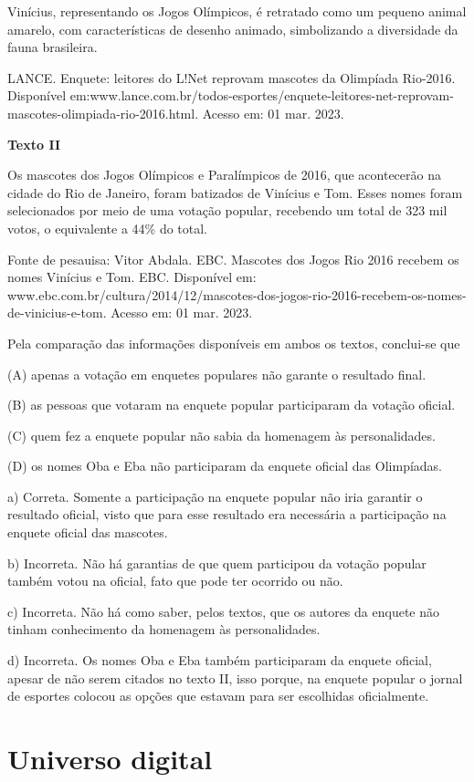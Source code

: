 \begin{itemize}
\begin{itemize}
Vinícius, representando os Jogos Olímpicos, é retratado como um pequeno
animal amarelo, com características de desenho animado, simbolizando a
diversidade da fauna brasileira.

LANCE. Enquete: leitores do L!Net reprovam mascotes da Olimpíada
Rio-2016. Disponível
em:www.lance.com.br/todos-esportes/enquete-leitores-net-reprovam-mascotes-olimpiada-rio-2016.html.
Acesso em: 01 mar. 2023.

\textbf{Texto II}

Os mascotes dos Jogos Olímpicos e Paralímpicos de 2016, que acontecerão
na cidade do Rio de Janeiro, foram batizados de Vinícius e Tom. Esses
nomes foram selecionados por meio de uma votação popular, recebendo um
total de 323 mil votos, o equivalente a 44\% do total.

Fonte de pesauisa: Vitor Abdala. EBC. Mascotes dos Jogos Rio 2016
recebem os nomes Vinícius e Tom. EBC. Disponível em:
www.ebc.com.br/cultura/2014/12/mascotes-dos-jogos-rio-2016-recebem-os-nomes-de-vinicius-e-tom.
Acesso em: 01 mar. 2023.

Pela comparação das informações disponíveis em ambos os textos,
conclui-se que

(A) apenas a votação em enquetes populares não garante o resultado
final.

(B) as pessoas que votaram na enquete popular participaram da votação
oficial.

(C) quem fez a enquete popular não sabia da homenagem às personalidades.

(D) os nomes Oba e Eba não participaram da enquete oficial das
Olimpíadas.

a) Correta. Somente a participação na enquete popular não iria garantir
o resultado oficial, visto que para esse resultado era necessária a
participação na enquete oficial das mascotes.

b) Incorreta. Não há garantias de que quem participou da votação popular
também votou na oficial, fato que pode ter ocorrido ou não.

c) Incorreta. Não há como saber, pelos textos, que os autores da enquete
não tinham conhecimento da homenagem às personalidades.

d) Incorreta. Os nomes Oba e Eba também participaram da enquete oficial,
apesar de não serem citados no texto II, isso porque, na enquete popular
o jornal de esportes colocou as opções que estavam para ser escolhidas
oficialmente.

\chapter{Universo digital}


\end{itemize}
\end{itemize}
